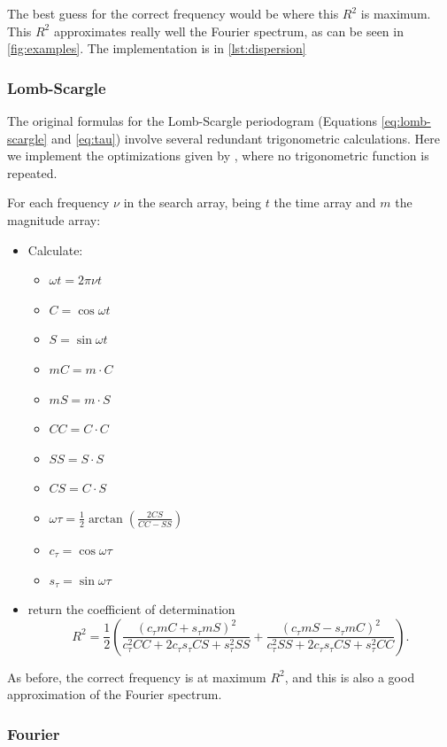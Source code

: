 The best guess for the correct frequency would be where this $R^2$ is maximum.
This $R^2$ approximates really well the Fourier spectrum, as can be seen in \autoref{fig:examples}.
The implementation is in \autoref{lst:dispersion}

\subsubsection{Lomb-Scargle}


The original formulas for the Lomb-Scargle periodogram (Equations \ref{eq:lomb-scargle} and \ref{eq:tau}) 
involve several redundant trigonometric calculations.
Here we implement the optimizations given by \cite{Townsend2010}, where no trigonometric function is repeated.

For each frequency $\nu$ in the search array, being $t$ the time array and $m$ the magnitude array:
\begin{itemize}
	\item Calculate:
	\begin{itemize}
		\item $\omega t = 2\pi\nu t$
		\item $C=\cos\omega t$
		\item $S=\sin\omega t$
		\item $mC= m \cdot C$
		\item $mS = m \cdot S$ 
		\item $CC=C\cdot C$
		\item $SS=S\cdot S$
		\item $CS=C \cdot S$
		\item $\omega\tau = \frac12 \arctan\left(\frac{2 CS}{CC-SS}\right)$
		\item $c_\tau = \cos\omega\tau$
		\item $s_\tau = \sin\omega\tau$
	\end{itemize}
	\item return the coefficient of determination
	$$
	R^2 = \frac12 \left(\frac{(c_\tau mC + s_\tau mS)^2}{c_\tau^2 CC + 2 c_\tau s_\tau CS + s_\tau^2 SS}
	+ \frac{(c_\tau mS-s_\tau mC)^2}{c_\tau^2 SS + 2 c_\tau s_\tau CS + s_\tau^2 CC}\right).
	$$
\end{itemize}

As before, the correct frequency is at maximum $R^2$, and this is also a good approximation of the Fourier spectrum.

\subsubsection{Fourier}

